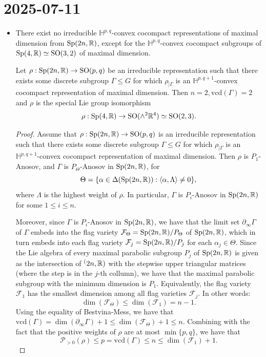 \documentclass{report}
\begin{document}
\section{2025-07-11}
\begin{itemize}
\item There exist no irreducible $\mathbb H^{p,q}$-convex cocompact representations of maximal dimension from $\operatorname{{\mathrm{Sp}}}(2n, \mathbb R)$, except for the $\mathbb H^{p,q}$-convex cocompact subgroups of $\operatorname{{\mathrm{Sp}}}(4, \mathbb R) \simeq \operatorname{{\mathrm{SO}}}(3,2)$ of maximal dimension.
\begin{lemma}
    Let $\rho: \operatorname{{\mathrm{Sp}}}(2n, \mathbb R) \to \operatorname{{\mathrm{SO}}}(p,q)$ be an irreducible representation such that there exists some discrete subgroup $\Gamma \leq G$ for which $\rho_{|\Gamma}$ is an $\mathbb H^{p,q+1}$-convex cocompact representation of maximal dimension.
    Then $n = 2, \mathrm{vcd}(\Gamma) = 2$ and $\rho$ is the special Lie group isomorphism
    \[
    \rho: \operatorname{{\mathrm{Sp}}}(4, \mathbb R) \to \operatorname{{\mathrm{SO}}}(\wedge^2 \mathbb R^4) \simeq \operatorname{{\mathrm{SO}}}(2,3).
    \]
\end{lemma}
\begin{proof}
    Assume that $\rho: \operatorname{{\mathrm{Sp}}}(2n, \mathbb R) \to \operatorname{{\mathrm{SO}}}(p,q)$ is an irreducible representation such that there exists some discrete subgroup $\Gamma \leq G$ for which $\rho_{|\Gamma}$ is an $\mathbb H^{p,q+1}$-convex cocompact representation of maximal dimension.
    Then $\rho$ is $P_1$-Anosov, and $\Gamma$ is $P_\Theta$-Anosov in $\operatorname{{\mathrm{Sp}}}(2n,\mathbb R)$, for
    \[
    \Theta = \{ \alpha \in \Delta(\operatorname{{\mathrm{Sp}}}(2n,\mathbb R)): \langle \alpha, \Lambda \rangle \neq 0 \},
    \]
    where $\Lambda$ is the highest weight of $\rho$.
    In particular, $\Gamma$ is $P_i$-Anosov in $\operatorname{{\mathrm{Sp}}}(2n,\mathbb R)$ for some $1 \leq i \leq n$.
    
    Moreover, since $\Gamma$ is $P_i$-Anosov in $\operatorname{{\mathrm{Sp}}}(2n,\mathbb R)$, we have that the limit set $\partial_\infty \Gamma$ of $\Gamma$ embeds into the flag variety $\mathcal F_\Theta = \operatorname{{\mathrm{Sp}}}(2n,\mathbb R) / P_\Theta$ of $\operatorname{{\mathrm{Sp}}}(2n,\mathbb R)$, which in turn embeds into each flag variety $\mathcal F_j = \operatorname{{\mathrm{Sp}}}(2n,\mathbb R) / P_j$ for each $\alpha_j \in \Theta$.
    Since the Lie algebra of every maximal parabolic subgroup $P_j$ of $\operatorname{{\mathrm{Sp}}}(2n,\mathbb R)$ is given as the intersection of $\sp(2n,\mathbb R)$ with the stepwise upper triangular matrices (where the step is in the $j$-th collumn), we have that the maximal parabolic subgroup with the minimum dimension is $P_1$.
    Equivalently, the flag variety $\mathcal F_1$ has the smallest dimension among all flag varieties $\mathcal F_j$.
    In other words:
    \[
    \dim(\mathcal F_\Theta) \leq \dim(\mathcal F_1) = n-1.
    \]
    Using the equality of Bestvina-Mess, we have that $\mathrm{vcd}(\Gamma) = \dim(\partial_\infty \Gamma) + 1 \leq \dim(\mathcal F_\Theta) + 1 \leq n$.
    Combining with the fact that the positive weights of $\rho$ are at most $\min\{p,q\}$, we have that
    \[
    \mathcal P_{>0}(\rho) \leq p = \mathrm{vcd}(\Gamma) \leq n \leq \dim(\mathcal F_1) + 1.
    \]


\end{proof}
\end{itemize}
\end{document}
